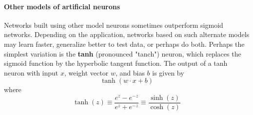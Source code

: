 \documentclass[12pt, letterpaper]{article}
\theoremstyle{definition}
\let\tb\textbf
\begin{document}
\paragraph{\tb{Other models of artificial neurons}}
Networks built using other model neurons sometimes outperform sigmoid networks. Depending on the application, networks based on such alternate models may learn faster, generalize better to test data, or perhaps do both. Perhaps the simplest variation is the \tb{tanh} (pronounced "tanch") neuron, which replaces the sigmoid function by the hyperbolic tangent function. The output of a tanh neuron with input $x$, weight vector $w$, and bias $b$ is given by
\begin{equation}
\tanh (w \cdot x + b)
\end{equation}
where
\begin{equation}
\tanh(z) \equiv \frac{e^z - e^{-z}}{e^z + e^{-z}} \equiv \frac{\sinh(z)}{\cosh(z)}
\end{equation}
\end{document}
